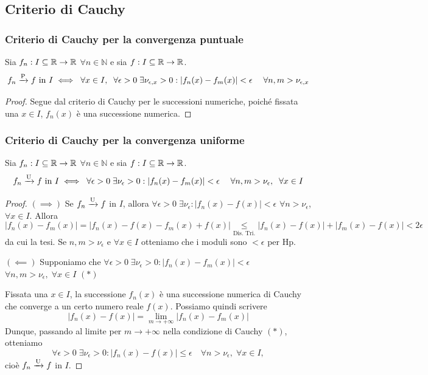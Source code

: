 \subsection{Criterio di Cauchy}
\subsubsection{Criterio di Cauchy per la convergenza puntuale}
\begin{theorem}
    Sia \(f_{n}:I\subseteq\mathbb{R}\to\mathbb{R}\) \(\forall n\in\mathbb{N}\) e sia \(f:I\subseteq\mathbb{R}\to\mathbb{R}\).
    \[
    f_{n}\conv{P}f \text{ in } I \iff \forall x\in I,\; \forall\epsilon>0\; \exists \nu_{\epsilon,x}>0 : |f_{n}(x)-f_{m}(x)|<\epsilon \quad \forall n,m>\nu_{\epsilon,x}
    \]
\end{theorem}
\begin{proof}
    Segue dal criterio di Cauchy per le successioni numeriche, poiché fissata una \(x\in I\), \(f_{n}(x)\) è una successione numerica.
\end{proof}

\subsubsection{Criterio di Cauchy per la convergenza uniforme}
\begin{theorem}
    Sia \(f_{n}:I\subseteq\mathbb{R}\to\mathbb{R}\) \(\forall n\in\mathbb{N}\) e sia \(f:I\subseteq\mathbb{R}\to\mathbb{R}\).
    \[
    f_{n}\conv{U}f \text{ in } I \iff \forall\epsilon>0\; \exists \nu_{\epsilon}>0 : |f_{n}(x)-f_{m}(x)|<\epsilon \quad \forall n,m>\nu_{\epsilon},\; \forall x\in I
    \]
\end{theorem}
\begin{proof}
    \((\implies)\) Se \(f_{n}\xrightarrow{\mathrm{U}}f\) in \(I\), allora \(\forall\epsilon>0\; \exists\nu_{\epsilon}: |f_{n}(x)-f(x)|<\epsilon\) \(\forall n>\nu_{\epsilon}\), \(\forall x\in I\).
    Allora
    \[
    |f_{n}(x)-f_{m}(x)| = |f_{n}(x)-f(x)-f_{m}(x)+f(x)| \underset{\text{Dis. Tri.}}{\leq} |f_{n}(x)-f(x)|+|f_{m}(x)-f(x)| < 2\epsilon
    \]
    da cui la tesi. Se \(n,m>\nu_{\epsilon}\) e \(\forall x\in I\) otteniamo che i moduli sono \(<\epsilon\) per Hp.

    \((\impliedby)\) Supponiamo che \(\forall\epsilon>0\; \exists\nu_{\epsilon}>0: |f_{n}(x)-f_{m}(x)|<\epsilon\) \(\forall n,m>\nu_{\epsilon},\; \forall x\in I\) \hfill \((*)\) 

    Fissata una \(x\in I\), la successione \(f_{n}(x)\) è una successione numerica di Cauchy che converge a un certo numero reale \(f(x)\). Possiamo quindi scrivere
    \[
    |f_{n}(x)-f(x)| = \lim_{m\to+\infty} |f_{n}(x)-f_{m}(x)|
    \]
    Dunque, passando al limite per \(m\to+\infty\) nella condizione di Cauchy \((*)\), otteniamo
    \[
    \forall\epsilon>0\; \exists\nu_{\epsilon}>0: |f_{n}(x)-f(x)|\leq\epsilon \quad \forall n>\nu_{\epsilon},\; \forall x\in I,
    \]
    cioè \(f_{n}\xrightarrow{\mathrm{U}}f\) in \(I\).
\end{proof}
